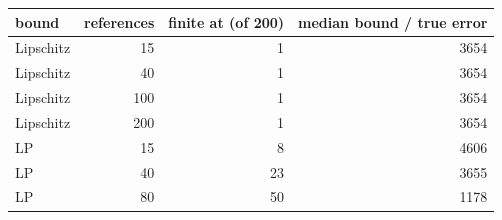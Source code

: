 \begin{tabular}{lrrr}
\toprule
bound & references & finite at (of 200) & median bound / true error \\
\midrule
Lipschitz & 15 & 1 & 3654 \\
Lipschitz & 40 & 1 & 3654 \\
Lipschitz & 100 & 1 & 3654 \\
Lipschitz & 200 & 1 & 3654 \\
LP & 15 & 8 & 4606 \\
LP & 40 & 23 & 3655 \\
LP & 80 & 50 & 1178 \\
\bottomrule
\end{tabular}
